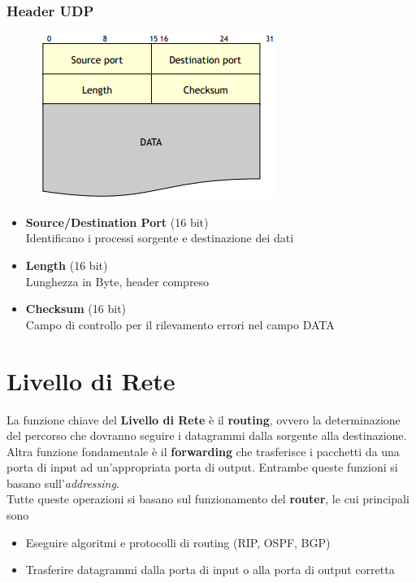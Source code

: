 \documentclass{article}
\begin{document}
            \subsubsection{Header UDP}
                \begin{figure}[H]
                    \centering
                    \includegraphics[width=\textwidth]{pic/header_udp.png}
                    \label{Header UDP}
                \end{figure}
                \begin{itemize}
                    \item \textbf{Source/Destination Port} (16 bit)\\
                          Identificano i processi sorgente e destinazione dei dati
                    \item \textbf{Length} (16 bit)\\
                          Lunghezza in Byte, header compreso
                    \item \textbf{Checksum} (16 bit)\\
                          Campo di controllo per il rilevamento errori nel campo DATA
                \end{itemize}

\newpage                
    \section{Livello di Rete}
        La funzione chiave del \textbf{Livello di Rete} è il \textbf{routing}, ovvero la determinazione del percorso che dovranno seguire i datagrammi dalla sorgente alla destinazione. Altra funzione fondamentale è il \textbf{forwarding} che trasferisce i pacchetti da una porta di input ad un'appropriata porta di output. Entrambe queste funzioni si basano sull'\textit{addressing}.\\
        Tutte queste operazioni si basano sul funzionamento del \textbf{router}, le cui principali sono
        \begin{itemize}
            \item Eseguire algoritmi e protocolli di routing (RIP, OSPF, BGP)
            \item Trasferire datagrammi dalla porta di input o alla porta di output corretta
        \end{itemize}
\end{document}
